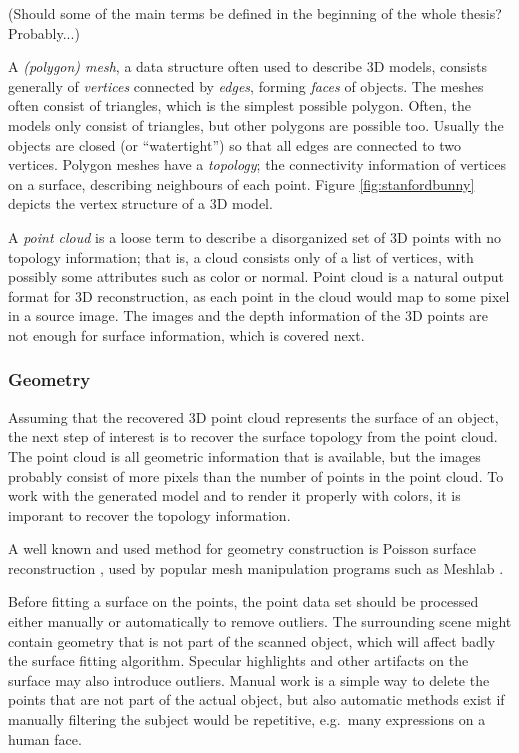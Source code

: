
(Should some of the main terms be defined in the beginning of the whole thesis? Probably...)

A \emph{(polygon) mesh}, a data structure often used to describe 3D models, consists generally of \emph{vertices} connected by \emph{edges}, forming \emph{faces} of objects.
The meshes often consist of triangles, which is the simplest possible polygon.
Often, the models only consist of triangles, but other polygons are possible too.
Usually the objects are closed (or ``watertight'') so that all edges are connected to two vertices.
Polygon meshes have a \emph{topology}; the connectivity information of vertices on a surface, describing neighbours of each point.
Figure \ref{fig:stanfordbunny} depicts the vertex structure of a 3D model.

A \emph{point cloud} is a loose term to describe a disorganized set of 3D points with no topology information; that is, a cloud consists only of a list of vertices, with possibly some attributes such as color or normal.
Point cloud is a natural output format for 3D reconstruction, as each point in the cloud would map to some pixel in a source image.
The images and the depth information of the 3D points are not enough for surface information, which is covered next.


\subsubsection{Geometry} %

Assuming that the recovered 3D point cloud represents the surface of an object, the next step of interest is to recover the surface topology from the point cloud.
The point cloud is all geometric information that is available, but the images probably consist of more pixels than the number of points in the point cloud.
To work with the generated model and to render it properly with colors, it is imporant to recover the topology information.

A well known and used method for geometry construction is Poisson surface reconstruction \cite{kazhdan2013screened}, used by popular mesh manipulation programs such as Meshlab \cite{meshlab}.

Before fitting a surface on the points, the point data set should be processed either manually or automatically to remove outliers.
The surrounding scene might contain geometry that is not part of the scanned object, which will affect badly the surface fitting algorithm.
Specular highlights and other artifacts on the surface may also introduce outliers.
Manual work is a simple way to delete the points that are not part of the actual object, but also automatic methods exist if manually filtering the subject would be repetitive, e.g.\ many expressions on a human face.

